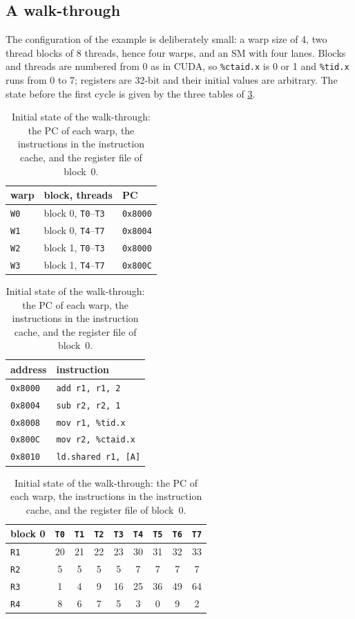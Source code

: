 \documentclass[../main.tex]{subfiles}
\begin{document}
\subsection{A walk-through}

The configuration of the example is deliberately small: a warp size of
4, two thread blocks of 8 threads, hence four warps, and an SM with four
lanes.  Blocks and threads are numbered from 0 as in CUDA, so
\texttt{\%ctaid.x} is 0 or 1 and \texttt{\%tid.x} runs from 0 to 7;
registers are 32-bit and their initial values are arbitrary.  The state
before the first cycle is given by the three tables of
\cref{tab:l04-walkthrough-state}.

\begin{table}[htbp]
  \centering
  \caption{Initial state of the walk-through: the PC of each warp, the
    instructions in the instruction cache, and the register file of
    block~0.}
  \label{tab:l04-walkthrough-state}
  \begin{tabular}{lll}
    \toprule
    warp & block, threads & PC \\
    \midrule
    \texttt{W0} & block 0, \texttt{T0}--\texttt{T3} & \texttt{0x8000} \\
    \texttt{W1} & block 0, \texttt{T4}--\texttt{T7} & \texttt{0x8004} \\
    \texttt{W2} & block 1, \texttt{T0}--\texttt{T3} & \texttt{0x8000} \\
    \texttt{W3} & block 1, \texttt{T4}--\texttt{T7} & \texttt{0x800C} \\
    \bottomrule
  \end{tabular}
  \hspace{6mm}
  \begin{tabular}{ll}
    \toprule
    address & instruction \\
    \midrule
    \texttt{0x8000} & \texttt{add r1, r1, 2} \\
    \texttt{0x8004} & \texttt{sub r2, r2, 1} \\
    \texttt{0x8008} & \texttt{mov r1, \%tid.x} \\
    \texttt{0x800C} & \texttt{mov r2, \%ctaid.x} \\
    \texttt{0x8010} & \texttt{ld.shared r1, [A]} \\
    \bottomrule
  \end{tabular}

  \medskip
  \begin{tabular}{lcccccccc}
    \toprule
    block 0 & \texttt{T0} & \texttt{T1} & \texttt{T2} & \texttt{T3} & \texttt{T4} & \texttt{T5} & \texttt{T6} & \texttt{T7} \\
    \midrule
    \texttt{R1} & 20 & 21 & 22 & 23 & 30 & 31 & 32 & 33 \\
    \texttt{R2} &  5 &  5 &  5 &  5 &  7 &  7 &  7 &  7 \\
    \texttt{R3} &  1 &  4 &  9 & 16 & 25 & 36 & 49 & 64 \\
    \texttt{R4} &  8 &  6 &  7 &  5 &  3 &  0 &  9 &  2 \\
    \bottomrule
  \end{tabular}
\end{table}
\end{document}
